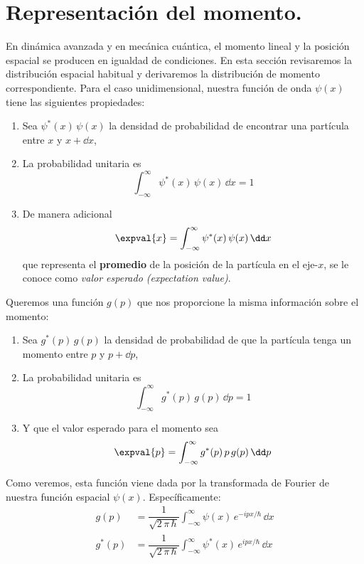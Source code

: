 \section{Representación del momento.}
En dinámica avanzada y en mecánica cuántica, el momento lineal y la posición espacial se producen en igualdad de condiciones. En esta sección revisaremos la distribución espacial habitual y derivaremos la distribución de momento correspondiente. Para el caso unidimensional, nuestra función de onda $\psi(x)$ tiene las siguientes propiedades:
\begin{enumerate}
\item Sea $\psi^{*}(x) \, \psi(x)$ la densidad de probabilidad de encontrar una partícula entre $x$ y $x + \dd{x}$,
\item La probabilidad unitaria es
\begin{equation}
\int_{-\infty}^{\infty} \psi^{*}(x) \, \psi(x) \, \dd x = 1
\label{eq:ecuacion_15_58}
\end{equation}
\item De manera adicional
\begin{equation}
\expval{x} = \int_{-\infty}^{\infty} \psi^{*} (x) \, \psi (x) \, \dd x
\label{eq:ecuacion_15_59}   
\end{equation}
que representa el \textbf{promedio} de la posición de la partícula en el eje-$x$, se le conoce como \emph{valor esperado (expectation value)}.
\end{enumerate}
Queremos una función $g(p)$ que nos proporcione la misma información sobre el momento:
\begin{enumerate}
\item Sea $g^{*}(p) \, g(p)$ la densidad de probabilidad de que la partícula tenga un momento entre $p$ y $p + \dd{p}$,
\item La probabilidad unitaria es
\begin{equation}
\int_{-\infty}^{\infty} g^{*}(p) \, g(p) \, \dd p = 1
\label{eq:ecuacion_15_60}
\end{equation}
\item Y que el valor esperado para el momento sea
\begin{equation}
\expval{p} = \int_{-\infty}^{\infty} g^{*} (p) \, p \, g(p) \, \dd p
\label{eq:ecuacion_15_61}   
\end{equation}
\end{enumerate}
Como veremos, esta función viene dada por la transformada de Fourier de nuestra función espacial $\psi(x)$. Específicamente:
\begin{align}
g (p) &= \dfrac{1}{\sqrt{2 \, \pi \, \hbar}} \int_{-\infty}^{\infty} \psi (x) \, e^{-i p x / \hbar} \, \dd x \\
g^{*} (p) &= \dfrac{1}{\sqrt{2 \, \pi \, \hbar}} \int_{-\infty}^{\infty} \psi^{*} (x) \, e^{i p x / \hbar} \, \dd x
\end{align}

